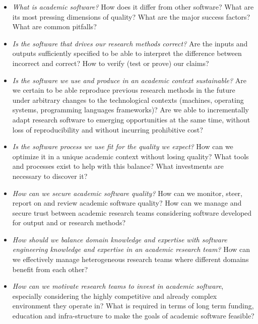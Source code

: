 \documentclass[a4paper,UKenglish]{dagman}
\begin{document}
\begin{itemize}
\item \emph{What is academic software?} How does it differ from other software? What are its most pressing dimensions of quality? What are the major success factors? What are common pitfalls?
\item \emph{Is the software that drives our research methods correct?} Are the inputs and outputs sufficiently specified to be able to interpret the difference between incorrect and correct? How to verify (test or prove) our claims?
\item \emph{Is the software we use and produce in an academic context sustainable?}
Are we certain to be able reproduce previous research methods in the future under arbitrary changes to the technological contexts (machines, operating systems, programming languages frameworks)? Are we able to incrementally adapt research software to emerging opportunities at the same time, without loss of reproducibility and without incurring prohibitive cost?
\item \emph{Is the software process we use fit for the quality we expect?} How can we optimize it in a unique academic context without losing quality? What tools and processes exist to help with this balance? What investments are necessary to discover it?
\item \emph{How can we secure academic software quality?} How can we monitor, steer, report on and review academic software quality? How can we manage and secure trust between academic research teams considering software developed for output and or research methods?
\item \emph{How should we balance domain knowledge and expertise with software engineering knowledge and expertise in an academic research team?} How can we effectively manage heterogeneous research teams where different domains benefit from each other?   
\item \emph{How can we motivate research teams to invest in academic software}, especially considering the highly competitive and already complex environment they operate in?
What is required in terms of long term funding, education and infra-structure to make the goals of academic software feasible?
\end{itemize}
\end{document}
